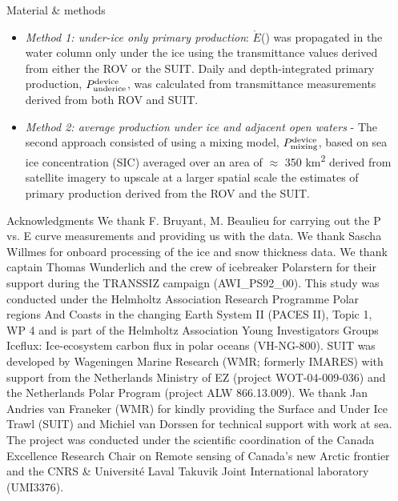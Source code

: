 \documentclass[final]{beamer}
\newlength{\sepwidth}
\newlength{\colwidth}
\newcommand{\separatorcolumn}{\begin{column}{\sepwidth}\end{column}}
\newcommand{\eparscalar}{\ensuremath{\mathring{E}}(\text{PAR})}
\newcommand{\ppundericedevice}{\ensuremath{P_{\text{\scriptsize underice}}^{\text{\scriptsize device}}}}
\newcommand{\ppmixingdevice}{\ensuremath{P_{\text{\scriptsize mixing}}^{\text{\scriptsize device}}}}
\begin{document}
\begin{frame}[t]
\begin{columns}[t]
\begin{column}{\colwidth}
\begin{block}{\small Material \& methods}
				\begin{itemize}
					\justifying
					\item \textit{Method 1: under-ice only primary production}: \eparscalar{} was propagated in the water column only under the ice using the transmittance values derived from either the ROV or the SUIT. Daily and depth-integrated primary production, \ppundericedevice{}, was calculated from transmittance measurements derived from both ROV and SUIT.
					\item \textit{Method 2: average production under ice and adjacent open waters} - The second approach consisted of using a mixing model, \ppmixingdevice{}, based on sea ice concentration (SIC) averaged over an area of $\approx$ 350 km\textsuperscript{2} derived from satellite imagery to upscale at a larger spatial scale the estimates of primary production derived from the ROV and the SUIT.
				\end{itemize}
			\end{block}

			\vspace{-3.0cm}
			\begin{block}{\small Acknowledgments}
				\footnotesize{We thank F. Bruyant, M. Beaulieu for carrying out the P vs. E curve measurements and providing us with the data. We thank Sascha Willmes for onboard processing of the ice and snow thickness data. We thank captain Thomas Wunderlich and the crew of icebreaker Polarstern for their support during the TRANSSIZ campaign (AWI\_PS92\_00). This study was conducted under the Helmholtz Association Research Programme Polar regions And Coasts in the changing Earth System II (PACES II), Topic 1, WP 4 and is part of the Helmholtz Association Young Investigators Groups Iceflux: Ice-ecosystem carbon flux in polar oceans (VH-NG-800). SUIT was developed by Wageningen Marine Research (WMR; formerly IMARES) with support from the Netherlands Ministry of EZ (project WOT-04-009-036) and the Netherlands Polar Program (project ALW 866.13.009). We thank Jan Andries van Franeker (WMR) for kindly providing the Surface and Under Ice Trawl (SUIT) and Michiel van Dorssen for technical support with work at sea. The project was conducted under the scientific coordination of the Canada Excellence Research Chair on Remote sensing of Canada's new Arctic frontier and the CNRS \& Université Laval Takuvik Joint International laboratory (UMI3376).}
			\end{block}
		\end{column}

		\separatorcolumn
	\end{columns}
\end{frame}
\end{document}
